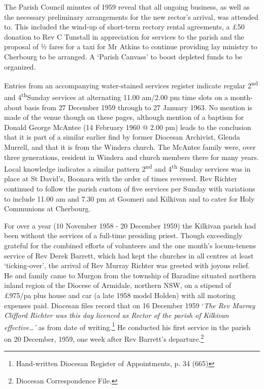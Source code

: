 The Parish Council minutes of 1959 reveal that all ongoing business, as
well as the necessary preliminary arrangements for the new rector's
arrival, was attended to. This included the wind-up of short-term
rectory rental agreements, a £50 donation to Rev C Tunstall in
appreciation for services to the parish and the proposal of ½ fares for
a taxi for Mr Atkins to continue providing lay ministry to Cherbourg to
be arranged. A `Parish Canvass' to boost depleted funds to be organized.

Entries from an accompanying water-stained services register indicate
regular 2\textsuperscript{nd} and 4\textsuperscript{th}Sunday services
at alternating 11.00 am/2.00 pm time slots on a month-about basis from
27 December 1959 through to 27 January 1963. No mention is made of the
venue though on these pages, although mention of a baptism for Donald
George McAntee (14 February 1960 @ 2.00 pm) leads to the conclusion that
it is part of a similar earlier find by former Diocesan Archivist,
Glenda Murrell, and that it is from the Windera church. The McAntee
family were, over three generations, resident in Windera and church
members there for many years. Local knowledge indicates a similar
pattern 2\textsuperscript{nd} and 4\textsuperscript{th} Sunday services
was in place at St David's, Boonara with the order of times reversed.
Rev Richter continued to follow the parish custom of five services per
Sunday with variations to include 11.00 am and 7.30 pm at Goomeri and
Kilkivan and to cater for Holy Communions at Cherbourg.

For over a year (10 November 1958 - 20 December 1959) the Kilkivan
parish had been without the services of a full-time presiding priest.
Though exceedingly grateful for the combined efforts of volunteers and
the one month's locum-tenens service of Rev Derek Barrett, which had
kept the churches in all centres at least `ticking-over', the arrival of
Rev Murray Richter was greeted with joyous relief. He and family came to
Murgon from the township of Baradine situated northern inland region of
the Diocese of Armidale, northern NSW, on a stipend of £975/pa plus
house and car (a late 1958 model Holden) with all motoring expenses
paid. Diocesan files record that on 16 December 1959 `\emph{The Rev
Murray Clifford Richter was this day licenced as Rector of the parish of
Kilkivan effective\ldots'} as from date of writing.\footnote{Hand-written
  Diocesan Register of Appointments, p. 34 (665)} He conducted his first
service in the parish on 20 December, 1959, one week after Rev Barrett's
departure.\footnote{Diocesan Correspondence File.}

